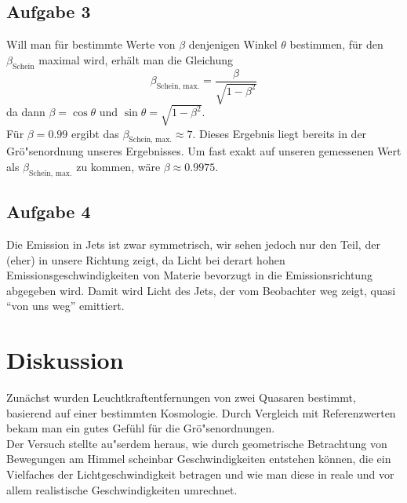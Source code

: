 \documentclass[12pt]{article}
\begin{document}
\subsection{Aufgabe 3}

Will man f\"{u}r bestimmte Werte von $\beta$ denjenigen Winkel $\theta$ bestimmen, f\"{u}r den $\beta_{\text{Schein}}$ maximal wird, erh\"{a}lt man die Gleichung
\begin{equation}
	\beta_{\text{Schein, max.}} = \frac{\beta}{\sqrt{1-\beta ^2}}
\end{equation}
da dann $\beta = \cos \theta$ und $\sin \theta = \sqrt{1-\beta ^2}$.\\
F\"{u}r $\beta = 0.99$ ergibt das $\beta_{\text{Schein, max.}} \approx 7$. Dieses Ergebnis liegt bereits in der Gr\"{o}"senordnung unseres Ergebnisses. Um fast exakt auf unseren gemessenen Wert als $\beta_{\text{Schein, max.}}$ zu kommen, w\"{a}re $\beta\approx0.9975$.

\subsection{Aufgabe 4}

Die Emission in Jets ist zwar symmetrisch, wir sehen jedoch nur den Teil, der (eher) in unsere Richtung zeigt, da Licht bei derart hohen Emissionsgeschwindigkeiten von Materie bevorzugt in die Emissionsrichtung abgegeben wird. Damit wird Licht des Jets, der vom Beobachter weg zeigt, quasi ``von uns weg'' emittiert.


\section{Diskussion}

Zun\"{a}chst wurden Leuchtkraftentfernungen von zwei Quasaren bestimmt, basierend auf einer bestimmten Kosmologie. Durch Vergleich mit Referenzwerten bekam man ein gutes Gef\"{u}hl f\"{u}r die Gr\"{o}"senordnungen. \\
Der Versuch stellte au"serdem heraus, wie durch geometrische Betrachtung von Bewegungen am Himmel scheinbar Geschwindigkeiten entstehen k\"{o}nnen, die ein Vielfaches der Lichtgeschwindigkeit betragen und wie man diese in reale und vor allem realistische Geschwindigkeiten umrechnet. 
\end{document}
